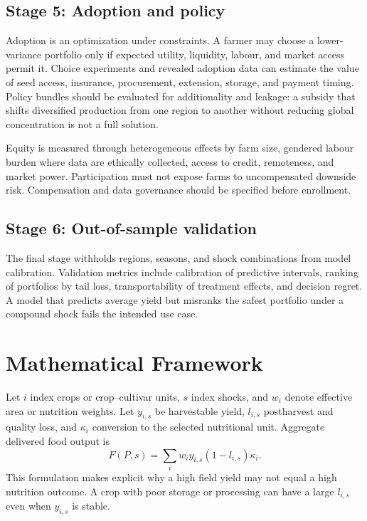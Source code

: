 \documentclass[conference]{IEEEtran}
\begin{document}
\subsection{Stage 5: Adoption and policy}
Adoption is an optimization under constraints. A farmer may choose a lower-variance portfolio only if expected utility, liquidity, labour, and market access permit it. Choice experiments and revealed adoption data can estimate the value of seed access, insurance, procurement, extension, storage, and payment timing. Policy bundles should be evaluated for additionality and leakage: a subsidy that shifts diversified production from one region to another without reducing global concentration is not a full solution.

Equity is measured through heterogeneous effects by farm size, gendered labour burden where data are ethically collected, access to credit, remoteness, and market power. Participation must not expose farms to uncompensated downside risk. Compensation and data governance should be specified before enrollment.

\subsection{Stage 6: Out-of-sample validation}
The final stage withholds regions, seasons, and shock combinations from model calibration. Validation metrics include calibration of predictive intervals, ranking of portfolios by tail loss, transportability of treatment effects, and decision regret. A model that predicts average yield but misranks the safest portfolio under a compound shock fails the intended use case.

\section{Mathematical Framework}
\label{sec:model}
Let $i$ index crops or crop--cultivar units, $s$ index shocks, and $w_i$ denote effective area or nutrition weights. Let $y_{i,s}$ be harvestable yield, $l_{i,s}$ postharvest and quality loss, and $\kappa_i$ conversion to the selected nutritional unit. Aggregate delivered food output is
\begin{equation}
F(P,s)=\sum_i w_i y_{i,s}(1-l_{i,s})\kappa_i .
\label{eq:food}
\end{equation}
This formulation makes explicit why a high field yield may not equal a high nutrition outcome. A crop with poor storage or processing can have a large $l_{i,s}$ even when $y_{i,s}$ is stable.
\end{document}
